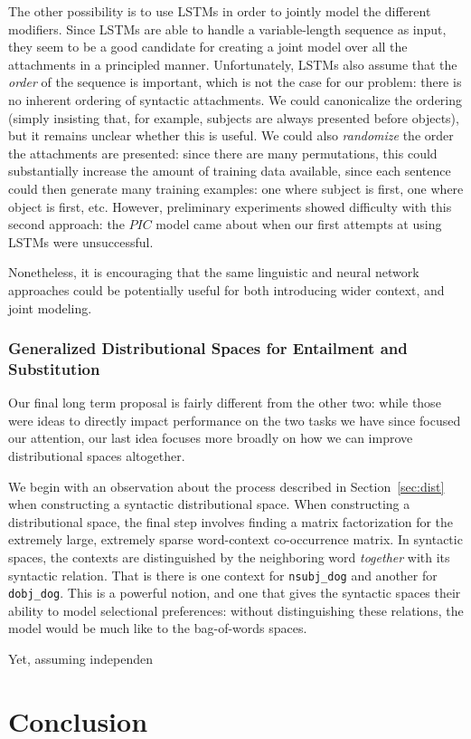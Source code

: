 \documentclass[letterpaper]{article}
\begin{document}
The other possibility is to use LSTMs in order to jointly model the different
modifiers. Since LSTMs are able to handle a variable-length sequence as input,
they seem to be a good candidate for creating a joint model over all the
attachments in a principled manner. Unfortunately, LSTMs also assume that the
{\em order} of the sequence is important, which is not the case for our problem:
there is no inherent ordering of syntactic attachments. We could canonicalize
the ordering (simply insisting that, for example, subjects are always presented
before objects), but it remains unclear whether this is useful. We could also
{\em randomize} the order the attachments are presented: since there are many
permutations, this could substantially increase the amount of training data
available, since each sentence could then generate many training examples: one
where subject is first, one where object is first, etc. However, preliminary
experiments showed difficulty with this second approach: the $PIC$ model came
about when our first attempts at using LSTMs were unsuccessful.

Nonetheless, it is encouraging that the same linguistic and neural network
approaches could be potentially useful for both introducing wider context,
and joint modeling.

\subsubsection{Generalized Distributional Spaces for Entailment and Substitution}

Our final long term proposal is fairly different from the other two: while
those were ideas to directly impact performance on the two tasks we have
since focused our attention, our last idea focuses more broadly on how
we can improve distributional spaces altogether.

We begin with an observation about the process described in
Section~\ref{sec:dist} when constructing a syntactic distributional space.
When constructing a distributional space, the final step involves finding a
matrix factorization for the extremely large, extremely sparse word-context
co-occurrence matrix. In syntactic spaces, the contexts are distinguished by
the neighboring word {\em together} with its syntactic relation. That is there
is one context for {\tt nsubj\_dog} and another for {\tt dobj\_dog}. This is a
powerful notion, and one that gives the syntactic spaces their ability
to model selectional preferences: without distinguishing these relations,
the model would be much like to the bag-of-words spaces.

Yet, assuming independen

\section{Conclusion}

\pagebreak


\end{document}
